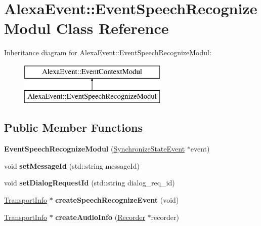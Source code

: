 \hypertarget{classAlexaEvent_1_1EventSpeechRecognizeModul}{}\section{Alexa\+Event\+:\+:Event\+Speech\+Recognize\+Modul Class Reference}
\label{classAlexaEvent_1_1EventSpeechRecognizeModul}
Inheritance diagram for Alexa\+Event\+:\+:Event\+Speech\+Recognize\+Modul\+:\begin{figure}[H]
\begin{center}
\leavevmode
\includegraphics[height=2.000000cm]{de/dac/classAlexaEvent_1_1EventSpeechRecognizeModul}
\end{center}
\end{figure}
\subsection*{Public Member Functions}
\begin{DoxyCompactItemize}
\item 
\mbox{\label{classAlexaEvent_1_1EventSpeechRecognizeModul_a9dfc613a8f75a42699dff3898ca5fded}} 
{\bfseries Event\+Speech\+Recognize\+Modul} (\hyperlink{structAlexaEvent_1_1SynchronizeStateEvent}{Synchronize\+State\+Event} $\ast$event)
\item 
\mbox{\label{classAlexaEvent_1_1EventSpeechRecognizeModul_a14dce3d94d047547f5a5f381fb5c9529}} 
void {\bfseries set\+Message\+Id} (std\+::string message\+Id)
\item 
\mbox{\label{classAlexaEvent_1_1EventSpeechRecognizeModul_a86ff460de311b1581e06b1d9fdc30658}} 
void {\bfseries set\+Dialog\+Request\+Id} (std\+::string dialog\+\_\+req\+\_\+id)
\item 
\mbox{\label{classAlexaEvent_1_1EventSpeechRecognizeModul_a01f03cbb8edb4f351f9ede092568f1a0}} 
\hyperlink{classAlexaEvent_1_1TransportInfo}{Transport\+Info} $\ast$ {\bfseries create\+Speech\+Recognize\+Event} (void)
\item 
\mbox{\label{classAlexaEvent_1_1EventSpeechRecognizeModul_a2925e9ce21db7eda51fdead0dd27d2b7}} 
\hyperlink{classAlexaEvent_1_1TransportInfo}{Transport\+Info} $\ast$ {\bfseries create\+Audio\+Info} (\hyperlink{classAlexaEvent_1_1Recorder}{Recorder} $\ast$recorder)
\end{DoxyCompactItemize}
